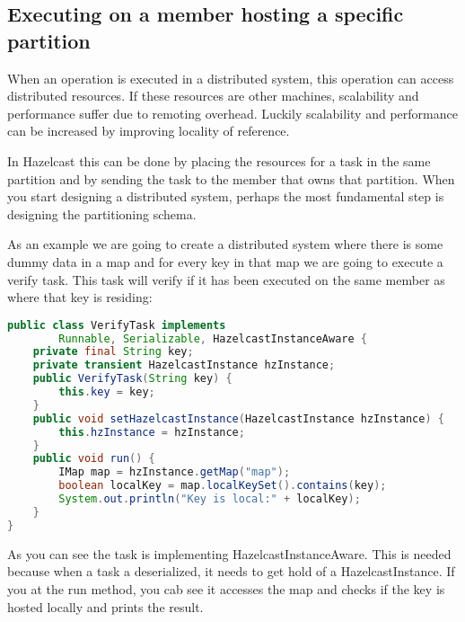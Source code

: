 \subsection{Executing on a member hosting a specific partition}
When an operation is executed in a distributed system, this operation can access distributed resources. If these resources are other machines, scalability and performance suffer due to remoting overhead. Luckily scalability and performance can be increased by improving locality of reference.

In Hazelcast this can be done by placing the resources for a task in the same partition and by sending the task to the member that owns that partition. When you start designing a distributed system, perhaps the most fundamental step is designing the partitioning schema.

As an example we are going to create a distributed system where there is some dummy data in a map and for every key in that map we are going to execute a verify task. This task will verify if it has been executed on the same member as where that key is residing:
\begin{lstlisting}[language=java]
public class VerifyTask implements
        Runnable, Serializable, HazelcastInstanceAware {
    private final String key;
    private transient HazelcastInstance hzInstance;
    public VerifyTask(String key) {
        this.key = key;
    }
    public void setHazelcastInstance(HazelcastInstance hzInstance) {
        this.hzInstance = hzInstance;
    }
    public void run() {
        IMap map = hzInstance.getMap("map");
        boolean localKey = map.localKeySet().contains(key);
        System.out.println("Key is local:" + localKey);
    }
}
\end{lstlisting}
As you can see the task is implementing HazelcastInstanceAware. This is needed because when a task a deserialized, it needs to get hold of a HazelcastInstance. If you at the run method, you cab see it accesses the map and checks if the key is hosted locally and prints the result.

